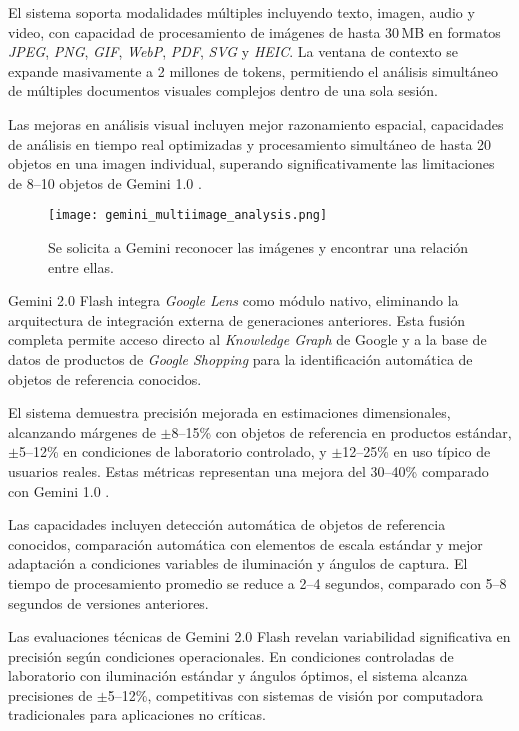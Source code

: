 El sistema soporta modalidades múltiples incluyendo texto, imagen, audio y video, con capacidad de procesamiento de imágenes de hasta 30\,MB en formatos \textit{JPEG}, \textit{PNG}, \textit{GIF}, \textit{WebP}, \textit{PDF}, \textit{SVG} y \textit{HEIC}. La ventana de contexto se expande masivamente a 2 millones de tokens, permitiendo el análisis simultáneo de múltiples documentos visuales complejos dentro de una sola sesión.

Las mejoras en análisis visual incluyen mejor razonamiento espacial, capacidades de análisis en tiempo real optimizadas y procesamiento simultáneo de hasta 20 objetos en una imagen individual, superando significativamente las limitaciones de 8--10 objetos de Gemini 1.0 \cite{Team20251}.


\begin{figure}[H]
    \centering
    \texttt{[image: gemini\_multiimage\_analysis.png]}
    \caption{Se solicita a Gemini reconocer las imágenes y encontrar una relación entre ellas.}
    \label{fig:gemini_analysis}
\end{figure}

Gemini 2.0 Flash integra \textit{Google Lens} como módulo nativo, eliminando la arquitectura de integración externa de generaciones anteriores. Esta fusión completa permite acceso directo al \textit{Knowledge Graph} de Google y a la base de datos de productos de \textit{Google Shopping} para la identificación automática de objetos de referencia conocidos.

El sistema demuestra precisión mejorada en estimaciones dimensionales, alcanzando márgenes de $\pm$8--15\% con objetos de referencia en productos estándar, $\pm$5--12\% en condiciones de laboratorio controlado, y $\pm$12--25\% en uso típico de usuarios reales. Estas métricas representan una mejora del 30--40\% comparado con Gemini 1.0 \cite{Team20251}.

Las capacidades incluyen detección automática de objetos de referencia conocidos, comparación automática con elementos de escala estándar y mejor adaptación a condiciones variables de iluminación y ángulos de captura. El tiempo de procesamiento promedio se reduce a 2--4 segundos, comparado con 5--8 segundos de versiones anteriores.

Las evaluaciones técnicas de Gemini 2.0 Flash revelan variabilidad significativa en precisión según condiciones operacionales. En condiciones controladas de laboratorio con iluminación estándar y ángulos óptimos, el sistema alcanza precisiones de $\pm$5--12\%, competitivas con sistemas de visión por computadora tradicionales para aplicaciones no críticas.

